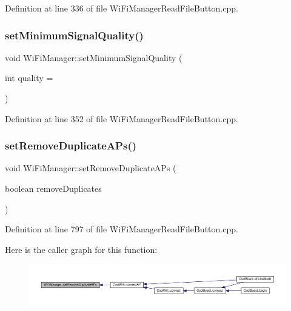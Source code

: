 Definition at line 336 of file Wi\+Fi\+Manager\+Read\+File\+Button.\+cpp.

\mbox{\label{class_wi_fi_manager_a8cc211e7e004a44798d5b422a874f94b}} 
\subsubsection{\texorpdfstring{set\+Minimum\+Signal\+Quality()}{setMinimumSignalQuality()}}
{\footnotesize\ttfamily void Wi\+Fi\+Manager\+::set\+Minimum\+Signal\+Quality (\begin{DoxyParamCaption}\item[{int}]{quality = {} }\end{DoxyParamCaption})}



Definition at line 352 of file Wi\+Fi\+Manager\+Read\+File\+Button.\+cpp.

\mbox{\label{class_wi_fi_manager_a4dd1dbf4f22900f226a3897b88155212}} 
\subsubsection{\texorpdfstring{set\+Remove\+Duplicate\+A\+Ps()}{setRemoveDuplicateAPs()}}
{\footnotesize\ttfamily void Wi\+Fi\+Manager\+::set\+Remove\+Duplicate\+A\+Ps (\begin{DoxyParamCaption}\item[{boolean}]{remove\+Duplicates }\end{DoxyParamCaption})}



Definition at line 797 of file Wi\+Fi\+Manager\+Read\+File\+Button.\+cpp.

Here is the caller graph for this function\+:\nopagebreak
\begin{figure}[H]
\begin{center}
\leavevmode
\includegraphics[width=350pt]{class_wi_fi_manager_a4dd1dbf4f22900f226a3897b88155212_icgraph}
\end{center}
\end{figure}
\mbox{\label{class_wi_fi_manager_a3666ca145de5e28d943db54fcb204e65}} 
